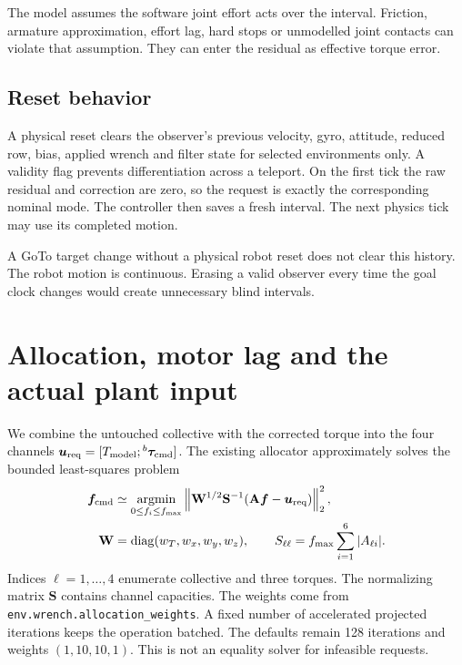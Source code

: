 \documentclass[11pt,a4paper]{article}
\newcommand{\vct}[1]{\boldsymbol{#1}}
\newcommand{\mat}[1]{\mathbf{#1}}
\newcommand{\bv}[1]{{}^{b}\vct{#1}}
\begin{document}
The model assumes the software joint effort acts over the interval. Friction,
armature approximation, effort lag, hard stops or unmodelled joint contacts can
violate that assumption. They can enter the residual as effective torque error.

\subsection{Reset behavior}
A physical reset clears the observer's previous velocity, gyro, attitude,
reduced row, bias, applied wrench and filter state for selected environments
only. A validity flag prevents differentiation across a teleport.
On the first tick the raw residual and correction are zero, so the request is
exactly the corresponding nominal mode. The controller then saves a fresh
interval. The next physics tick may use its completed motion.

A GoTo target change without a physical robot reset does not clear this history.
The robot motion is continuous. Erasing a valid observer every time the goal
clock changes would create unnecessary blind intervals.

\section{Allocation, motor lag and the actual plant input}\label{sec:allocation}

We combine the untouched collective with the corrected torque into the four
channels $\vct u_{\rm req}=[T_{\rm model};\bv\tau_{\rm cmd}]$. The existing
allocator approximately solves the bounded least-squares problem
\begin{equation}
\begin{aligned}
\vct f_{\rm cmd}&\simeq\underset{0\le f_i\le f_{\max}}{\operatorname{argmin}}
\left\|\mat W^{1/2}\mat S^{-1}
(\mat A\vct f-\vct u_{\rm req})\right\|_2^2,\\
\mat W&=\operatorname{diag}(w_T,w_x,w_y,w_z),\qquad
S_{\ell\ell}=f_{\max}\sum_{i=1}^{6}|A_{\ell i}|.
\end{aligned}\label{eq:allocate}
\end{equation}
Indices $\ell=1,\ldots,4$ enumerate collective and three torques. The normalizing
matrix $\mat S$ contains channel capacities. The weights come from
\texttt{env.wrench.allocation\_weights}. A fixed number of accelerated projected
iterations keeps the operation batched. The defaults remain 128 iterations and
weights $(1,10,10,1)$. This is not an equality solver for infeasible requests.
\end{document}
